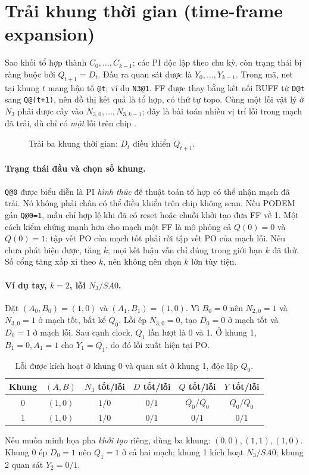 \section{Trải khung thời gian (time-frame expansion)}
\label{sec:p4-unroll}
Sao khối tổ hợp thành $C_0,\ldots,C_{k-1}$; các PI độc lập theo chu kỳ,
còn trạng thái bị ràng buộc bởi $Q_{t+1}=D_t$. Đầu ra quan sát được là
$Y_0,\ldots,Y_{k-1}$. Trong mã, net tại khung $t$ mang hậu tố
\texttt{@t}; ví dụ \texttt{N3@1}. FF được thay bằng kết nối BUFF từ
\texttt{D@t} sang \texttt{Q@(t+1)}, nên đồ thị kết quả là tổ hợp, có thứ tự
topo. Cùng một lỗi vật lý ở $N_3$ phải được cấy vào $N_{3,0},\ldots,
N_{3,k-1}$; đây là bài toán nhiều vị trí lỗi trong mạch đã trải, dù chỉ có
\emph{một} lỗi trên chip \cite{p4_nptel_seq}.
\begin{figure}[H]
\centering
\caption{Trải ba khung thời gian: $D_t$ điều khiển $Q_{t+1}$.}
\label{fig:p4-time-frames}
\end{figure}

\paragraph{Trạng thái đầu và chọn số khung.}
\texttt{Q@0} được biểu diễn là PI \emph{hình thức} để thuật toán tổ hợp có
thể nhận mạch đã trải. Nó không phải chân có thể điều khiển trên chip không
scan. Nếu PODEM gán \texttt{Q@0=1}, mẫu chỉ hợp lệ khi đã có reset hoặc chuỗi
khởi tạo đưa FF về 1. Một cách kiểm chứng mạnh hơn cho mạch một FF là mô
phỏng cả $Q(0)=0$ và $Q(0)=1$: tập vết PO của mạch tốt phải rời tập vết PO
của mạch lỗi. Nếu chưa phát hiện được, tăng $k$; mọi kết luận vẫn chỉ đúng
trong giới hạn $k$ đã thử. Số cổng tăng xấp xỉ theo $k$, nên không nên chọn
$k$ lớn tùy tiện.

\paragraph{Ví dụ tay, $k=2$, lỗi $N_3/SA0$.}
Đặt $(A_0,B_0)=(1,0)$ và $(A_1,B_1)=(1,0)$. Vì $B_0=0$ nên
$N_{2,0}=1$ và $N_{3,0}=1$ ở mạch tốt, bất kể $Q_0$. Lỗi ép
$N_{3,0}=0$, tạo $D_0=0$ ở mạch tốt và $D_0=1$ ở mạch lỗi.
Sau cạnh clock, $Q_1$ lần lượt là 0 và 1. Ở khung 1, $B_1=0,A_1=1$
cho $Y_1=Q_1$, do đó lỗi xuất hiện tại PO.
\begin{table}[H]
\centering\small
\begin{tabular}{@{}c c c c c c@{}}
\toprule
Khung & $(A,B)$ & $N_3$ tốt/lỗi & $D$ tốt/lỗi & $Q$ tốt/lỗi & $Y$ tốt/lỗi\\
\midrule
0 & $(1,0)$ & $1/0$ & $0/1$ & $Q_0/Q_0$ & $Q_0/Q_0$\\
1 & $(1,0)$ & $1/0$ & $0/1$ & $0/1$ & $0/1$\\
\bottomrule
\end{tabular}
\caption{Lỗi được kích hoạt ở khung 0 và quan sát ở khung 1, độc lập $Q_0$.}
\label{tab:p4-trace-2}
\end{table}
Nếu muốn minh họa pha \emph{khởi tạo} riêng, dùng ba khung:
$(0,0),(1,1),(1,0)$. Khung 0 ép $D_0=1$ nên $Q_1=1$ ở cả hai mạch;
khung 1 kích hoạt $N_3/SA0$; khung 2 quan sát $Y_2=0/1$.

